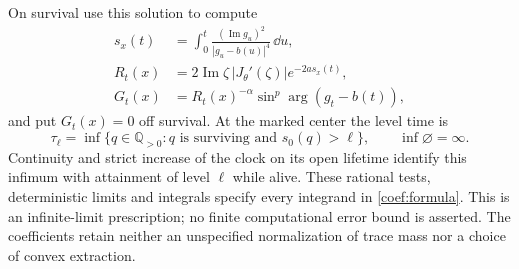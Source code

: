 On survival use this solution to compute
\begin{align*}
 s_x(t)&=\int_0^t\frac{(\operatorname{Im}g_u)^2}{|g_u-b(u)|^4}\,\dd u,\\
 R_t(x)&=2\operatorname{Im}\zeta\,|J_\theta'(\zeta)|e^{-2as_x(t)},\\
 G_t(x)&=R_t(x)^{-\alpha}\sin^p\arg(g_t-b(t)),
\end{align*}
and put $G_t(x)=0$ off survival.  At the marked center the level time is
\[
 \tau_\ell=
 \inf\{q\in\mathbb Q_{>0}:q\text{ is surviving and }s_0(q)>\ell\},
 \qquad \inf\varnothing=\infty.
\]
Continuity and strict increase of the clock on its open lifetime identify
this infimum with attainment of level $\ell$ while alive.  These rational
tests, deterministic limits and integrals specify every integrand in
\eqref{coef:formula}.  This is an infinite-limit prescription; no finite computational error
bound is asserted. The coefficients retain neither an unspecified
normalization of trace mass nor a choice of convex extraction.
